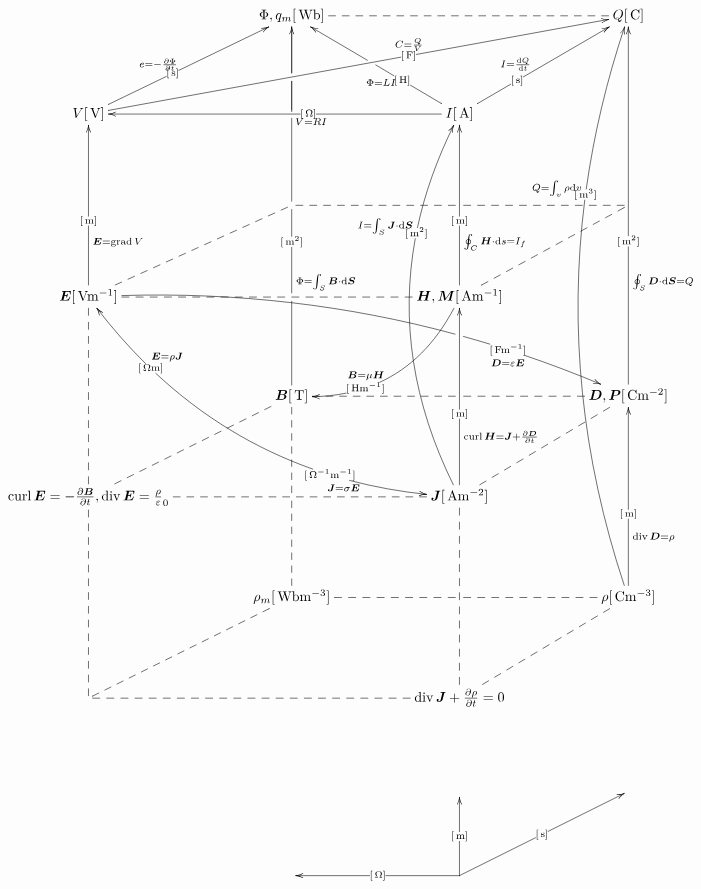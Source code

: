 \documentclass[a4j,8pt]{jarticle}
\makeatletter
\def\uni#1{[\unit{#1}]}
\def\cell#1#2{#1\uni{#2}}
\def\dottedhole#1{\ar@{--}[#1]|!{[ld];[lu]}\hole}
\def\dotted#1{\ar@{--}[#1]}
\def\arrow#1#2#3{\ar[#1]|-(.4){\uni{#2}}_(.3){#3}}
\def\arroww#1#2#3{\ar[#1]|-(.3){\uni{#2}}^(.4){#3}|!{[ll];[ru]}\hole}
\def\arrowu#1#2#3{\ar[#1]|-(.4){\uni{#2}}^(.4){#3}}
\def\arrowx#1#2#3{\ar[#1]|-(.6){\uni{#2}}^(.6){#3}}
\def\arrowy#1#2#3{\ar@/^3pc/[#1]|-(.7){\uni{#2}}^(.7){#3}}
\def\arrowyy#1#2#3#4#5{\ar@/_3pc/@{<->}[#1]|-(0.2){\uni{#4}}^(0.2){#5}|-(.75){\uni{#2}}_(.75){#3}}
\def\arrowz#1#2#3{\ar@/^2pc/[#1]|-(.7){\uni{#2}}_(.6){#3}}
\def\arrowzz#1#2#3{\ar@/^2pc/[#1] |!{[rr];[rrdd]}\hole |-(.8){\uni{#2}}_(.8){#3\quad}}
\def\arrowp#1#2#3{\ar@{->}[#1] _(.3){#3} |!{[u];[u]}\hole |-(0.4){\uni{#2}} |!{[uu];[uu]}\hole |!{[uuu];[uuu]}\hole |!{[luuu];[ruuuru]}\hole} %
\def\B{\bm B}
\def\D{\bm D}
\def\E{\bm E}
\def\H{\bm H}
\def\J{\bm J}
\def\S{\bm S}
\def\P{\bm P}
\def\M{\bm M}
\makeatother
\begin{document}
\[\xymatrix@=0.75in{
 & \cell{\Phi, q_m}{Wb}\dotted{rr}\ar @{-}[d]|!{[ld];[rr]}\hole     &        & \cell{Q}{C}\\
 \cell V V\arrowu{ur}{s}{e=-\fracpd\Phi t}\arrowx{rrru}{F}{C=\frac Q V}      &          & \cell I A\arrowu{ll}{O}{V=RI}\arroww{ur}{s}{I=\diff Q t}\arroww{lu}{H}{\Phi=LI}        & \\
 &          &        & \dottedhole{ll}\dotted{ld}\\
 \cell{\E}{Vm^{-1}}\arrow{uu}{m}{\E=\grad V}\dotted{rr}\dotted{ru}\arrowzz{rrrd}{Fm^{-1}}{\D=\varepsilon\E}\arrowyy{rrdd}{O^{-1}m^{-1}}{\J=\sigma\E}{Om}{\E=\rho\J } &          & \cell{\H,\M}{Am^{-1}}\arrow{uu}{m}{\oint_C\H\cdot\dd s=I_f}\arrowz{dl}{Hm^{-1}}{\B=\mu\H}       & \\
 & \cell{\B}{T}\arrowp{uuuu}{m^2}{\Phi=\int_S\B\cdot\dd\S} &        & \cell{\D,\P}{Cm^{-2}}\arrow{uuuu}{m^2}{\oint_S\D\cdot\dd\bm{S}=Q}\dottedhole{ll}\dotted{ld}\\
 {{\curl\E=-\frac{\partial\B}{\partial t}} ,{\diver\E=\frac\rho\varepsilon_0}}\dotted{uu}\dotted{rr}\dotted{ru}     &          & \cell{\J}{Am^{-2}}\arrow{uu}{m}{\curl\H=\J +\frac{\partial\D}{\partial t}}\arrowy{uuuu}{m^2}{I=\int_S\J\cdot\dd\S}\\
 & \cell{\rho_m}{Wbm^{-3}}\ar@{--}[uu]|!{[u];[u]}\hole      &        & \cell{\rho}{Cm^{-3}}\arrow{uu}{m}{\diver\D=\rho}\arrowy{uuuuuu}{m^3}{Q=\int_v\rho\dd v}\dottedhole{ll}\dotted{ld}\\
 \dotted{uu}\dotted{rr}\dotted{ru}           &          & \diver\J +\frac{\partial\rho}{\partial t}=0\dotted{uu}      & \\
 &          &        & \\
 &          & *=0{}\ar[u]|-{\uni{m}}\ar[ru]|-{\uni{s}}\ar[l]|-{\uni{O}}\\
 }\]
\end{document}
